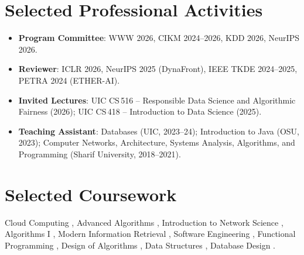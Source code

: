 \documentclass[a4paper,10pt]{article}
\newcommand{\resumeItemListStart}{\begin{itemize}[leftmargin=*,labelsep=1mm,itemsep=0.6mm]}
\newcommand{\resumeItemListEnd}{\end{itemize}\vspace{-1.2mm}}
\begin{document}
\section{\textbf{Selected Professional Activities}}
\resumeItemListStart
  \item \textbf{Program Committee}: WWW 2026, CIKM 2024--2026, KDD 2026, NeurIPS 2026.
  \item \textbf{Reviewer}: ICLR 2026, NeurIPS 2025 (DynaFront), IEEE TKDE 2024--2025, PETRA 2024 (ETHER-AI).
  \item \textbf{Invited Lectures}: UIC CS\,516 -- Responsible Data Science and Algorithmic Fairness (2026); UIC CS\,418 -- Introduction to Data Science (2025).
  \item \textbf{Teaching Assistant}: Databases (UIC, 2023--24); Introduction to Java (OSU, 2023); Computer Networks, Architecture, Systems Analysis, Algorithms, and Programming (Sharif University, 2018--2021).
\resumeItemListEnd
\vspace{-0.5mm}

\section{\textbf{Selected Coursework}}
\small{Cloud Computing \small{}, \space Advanced Algorithms \small{}, \space Introduction to Network Science \small{}, \space Algorithms I \small{}, \space Modern Information Retrieval \small{}, \space Software Engineering \small{}, \space Functional Programming \small{}, \space Design of Algorithms \small{}, \space Data Structures \small{}, \space Database Design \small{}.}
\vspace{-1mm}
\end{document}
